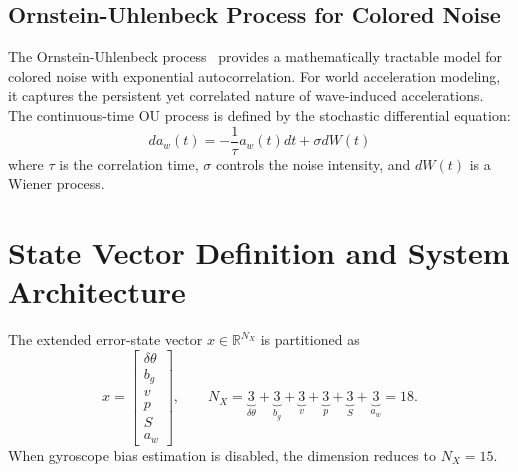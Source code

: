 \documentclass[11pt,letterpaper]{article}
\begin{document}
\subsection{Ornstein-Uhlenbeck Process for Colored Noise}

The Ornstein-Uhlenbeck process~\cite{uhlenbeck1930} provides a mathematically tractable model for colored noise with exponential autocorrelation. For world acceleration modeling, it captures the persistent yet correlated nature of wave-induced accelerations. The continuous-time OU process is defined by the stochastic differential equation:
\[
da_w(t) = -\frac{1}{\tau}a_w(t)dt + \sigma dW(t)
\]
where $\tau$ is the correlation time, $\sigma$ controls the noise intensity, and $dW(t)$ is a Wiener process.

\section{State Vector Definition and System Architecture}
\label{sec:state_definition}

The extended error-state vector $x\in\mathbb{R}^{N_X}$ is partitioned as
\[
x = 
\begin{bmatrix}
\delta\theta \\ b_g \\ v \\ p \\ S \\ a_w
\end{bmatrix},
\qquad
N_X = \underbrace{3}_{\delta\theta} + \underbrace{3}_{b_g} + \underbrace{3}_{v} + \underbrace{3}_{p} + \underbrace{3}_{S} + \underbrace{3}_{a_w} = 18.
\]
When gyroscope bias estimation is disabled, the dimension reduces to $N_X = 15$.
\end{document}
